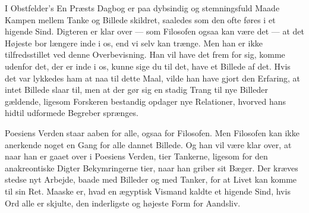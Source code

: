 \documentclass[12pt]{article}
\newcommand{\opage}[1]{\marginnote{\footnotesize\textit{[#1]}}}
\begin{document}
I Obstfelder's \guillemotright En Præsts Dagbog\guillemotleft{} er paa
dybsindig og stemningsfuld Maade Kampen mellem Tanke og Billede skildret,
saaledes som den ofte føres i et higende Sind. Digteren er klar over ---
som Filosofen ogsaa kan være
\opage{108} det --- at det Højeste bor \guillemotright længere inde i os, end vi selv
kan trænge\guillemotleft. Men han er ikke tilfredsstillet ved denne
Overbevisning. Han vil have det frem for sig, \guillemotright komme udenfor
det, der er inde i os\guillemotleft, kunne sige du til det, have et
Billede af det. Hvis det var lykkedes ham at naa til dette Maal, vilde han
have gjort den Erfaring, at intet Billede slaar til, men at der gør sig en
stadig Trang til nye Billeder gældende, ligesom Forskeren bestandig
opdager nye Relationer, hvorved hans hidtil udformede Begreber sprænges.

Poesiens Verden staar aaben for alle, ogsaa for Filosofen. Men Filosofen
kan ikke anerkende noget en Gang for alle dannet Billede. Og han vil være
klar over, at naar han er gaaet over i Poesiens Verden, tier Tankerne,
ligesom for den anakreontiske Digter \guillemotright Bekymringerne
tier\guillemotleft, naar han griber sit Bæger. Der kræves stedse nyt
Arbejde, baade med Billeder og med Tanker, for at Livet kan komme til sin
Ret. Maaske er, hvad en ægyptisk Vismand kaldte \guillemotright et higende
Sind, hvis Ord alle er skjulte\guillemotleft, den inderligste og højeste
Form for Aandsliv.
\end{document}
